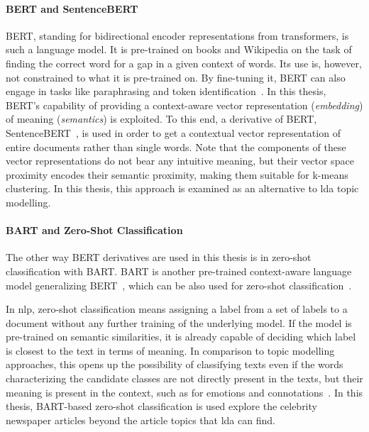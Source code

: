 \paragraph{BERT and SentenceBERT}\label{ch:sentencebert}
BERT, standing for bidirectional encoder representations from transformers, is such a language model. It is pre-trained on books and Wikipedia on the task of finding the correct word for a gap in a given context of words. Its use is, however, not constrained to what it is pre-trained on. By fine-tuning it, BERT can also engage in tasks like paraphrasing and token identification~\autocite{devlin_bert_2019}. In this thesis, BERT's capability of providing a context-aware vector representation (\textit{embedding}) of meaning (\textit{semantics}) is exploited. To this end, a derivative of BERT, SentenceBERT~\autocite{reimers_sentence-bert_2019}, is used in order to get a contextual vector representation of entire documents rather than single words. Note that the components of these vector representations do not bear any intuitive meaning, but their vector space proximity encodes their semantic proximity, making them suitable for k-means clustering. In this thesis, this approach is examined as an alternative to \gls{lda} topic modelling.

\paragraph{BART and Zero-Shot Classification}\label{ch:zero_shot}
The other way BERT derivatives are used in this thesis is in zero-shot classification with BART. BART is another pre-trained context-aware language model generalizing BERT~\autocite{lewis_bart_2020}, which can be also used for zero-shot classification~\autocite{huggingfacebart-large-mnli_facebookbart-large-mnli_nodate,davison_zero-shot_2020}.

In \gls{nlp}, zero-shot classification means assigning a label from a set of labels to a document without any further training of the underlying model. If the model is pre-trained on semantic similarities, it is already capable of deciding which label is closest to the text in terms of meaning. In comparison to topic modelling approaches, this opens up the possibility of classifying texts even if the words characterizing the candidate classes are not directly present in the texts, but their meaning is present in the context, such as for emotions and connotations~\autocite{yin_benchmarking_2019}. In this thesis, BART-based zero-shot classification is used explore the celebrity newspaper articles beyond the article topics that \gls{lda} can find.
